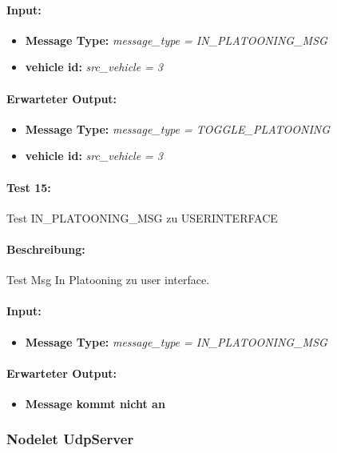 \documentclass[a4paper, 12pt, titlepage]{scrartcl}
\begin{document}
{			\paragraph{Input:}
			\begin{itemize} \itemsep-0.5em
				\item \textbf{Message Type:} \emph{message\_type = IN\_PLATOONING\_MSG}
				\item \textbf{vehicle id:} \emph{src\_vehicle = 3}
			\end{itemize}
			\paragraph{Erwarteter Output:}
			\begin{itemize} \itemsep-0.5em
				\item \textbf{Message Type:} \emph{message\_type = TOGGLE\_PLATOONING}
				\item \textbf{vehicle id:} \emph{src\_vehicle = 3}
			\end{itemize}

			\paragraph{Test 15:}{Test IN\_PLATOONING\_MSG zu USERINTERFACE}
			\paragraph{Beschreibung:} Test Msg In Platooning zu user interface.
			\paragraph{Input:}
			\begin{itemize} \itemsep-0.5em
				\item \textbf{Message Type:} \emph{message\_type = IN\_PLATOONING\_MSG}
			\end{itemize}
			\paragraph{Erwarteter Output:}
			\begin{itemize} \itemsep-0.5em
				\item \textbf{Message kommt nicht an}
			\end{itemize}

			\subsubsection{Nodelet UdpServer}
			\label{node_upd_server}
}
\end{document}
